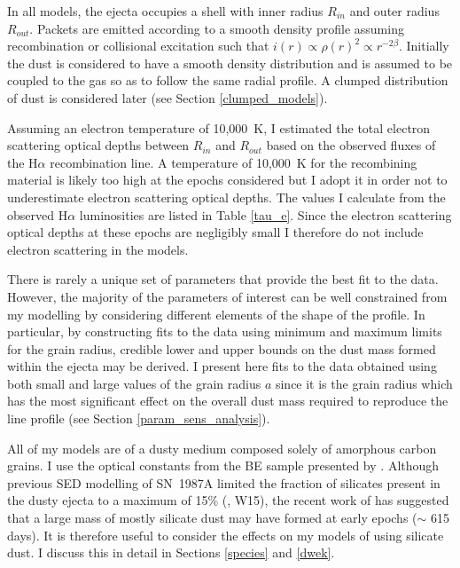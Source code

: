 In all models, the ejecta occupies a shell with inner radius $R_{in}$ and 
outer radius $R_{out}$.  Packets are emitted according to a smooth density 
profile assuming recombination or collisional excitation such that $i(r) 
\propto \rho(r)^2 \propto r^{-2\beta}$.  Initially the dust is considered 
to have a smooth density distribution and is assumed to be coupled to the 
gas so as to follow the same radial profile.  A clumped distribution of 
dust is considered later (see Section \ref{clumped_models}).

Assuming an electron temperature of 10,000~K, I estimated the total electron scattering optical depths between $R_{in}$ and $R_{out}$ based on the 
observed fluxes of the H$\alpha$ recombination line. A temperature of 10,000~K for the recombining material is 
likely too high at the epochs considered but I adopt it in order
not to underestimate electron scattering optical depths.  The values 
I calculate from the observed H$\alpha$ luminosities are listed in Table 
\ref{tau_e}.  Since the electron scattering optical depths at these epochs 
are negligibly small I therefore do not include electron scattering in 
the models.




There is rarely a unique set of parameters that provide the best fit to 
the data.  However, the majority of the parameters of interest can be well 
constrained from my modelling by considering different elements of the 
shape of the profile.  In particular, by constructing fits to the data 
using minimum and maximum limits for the grain radius, credible lower and 
upper bounds on the dust mass formed within the ejecta may be derived.  
I present here fits to the data obtained using both small and large 
values of the grain radius $a$ since it is the grain radius which has the 
most significant effect on the overall dust mass required to reproduce the 
line profile (see Section \ref{param_sens_analysis}).


All of my models are of a dusty medium composed solely of amorphous 
carbon grains. I use the optical constants from the BE sample presented 
by \citet{Zubko1996}.  Although previous SED modelling of SN~1987A  
limited the fraction of silicates present in the dusty ejecta to a maximum 
of 15\% (\citet{Ercolano2007}, W15), the recent work of \citet{Dwek2015} has suggested that a large mass of mostly silicate dust may have formed at early epochs ($\sim$ 615 days).  It is therefore useful to consider the effects 
on my models of using silicate dust.  I discuss this in detail in 
Sections \ref{species} and \ref{dwek}.

